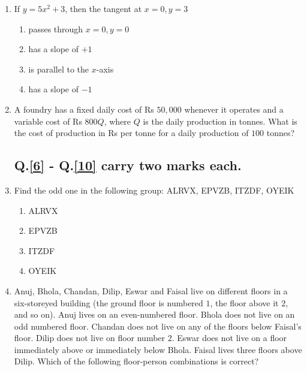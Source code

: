 \documentclass[journal]{IEEEtran}
\begin{document}
\begin{enumerate}
    \item If $y = 5x^2 +3$, then the tangent at $x=0, y=3$
        \begin{enumerate}
            \item passes through $x=0, y=0$
            \item has a slope of $+1$
            \item is parallel to the $x$-axis
            \item has a slope of $-1$
        \end{enumerate}

    \item A foundry has a fixed daily cost of Rs $50,000$ whenever it operates and a variable cost of Rs $800Q$, where $Q$ is the daily production in tonnes. What is the cost of production in Rs per tonne for a daily production of $100$ tonnes?
    
    \subsection*{Q.\ref{6} - Q.\ref{10} carry two marks each.}

    \item \label{6} Find the odd one in the following group: ALRVX, EPVZB, ITZDF, OYEIK
        \begin{enumerate}
            \item ALRVX
            \item EPVZB
            \item ITZDF
            \item OYEIK
        \end{enumerate}

    \item Anuj, Bhola, Chandan, Dilip, Eswar and Faisal live on different floors in a six-storeyed building (the ground floor is numbered $1$, the floor above it $2$, and so on). Anuj lives on an even-numbered floor. Bhola does not live on an odd numbered floor. Chandan does not live on any of the floors below Faisal's floor. Dilip does not live on floor number $2$. Eswar does not live on a floor immediately above or immediately below Bhola. Faisal lives three floors above Dilip. Which of the following floor-person combinations is correct?
    
        \begin{table}[h!]    
            \centering
            
            \caption{}
            \label{7}
        \end{table}


\end{enumerate}
\end{document}
